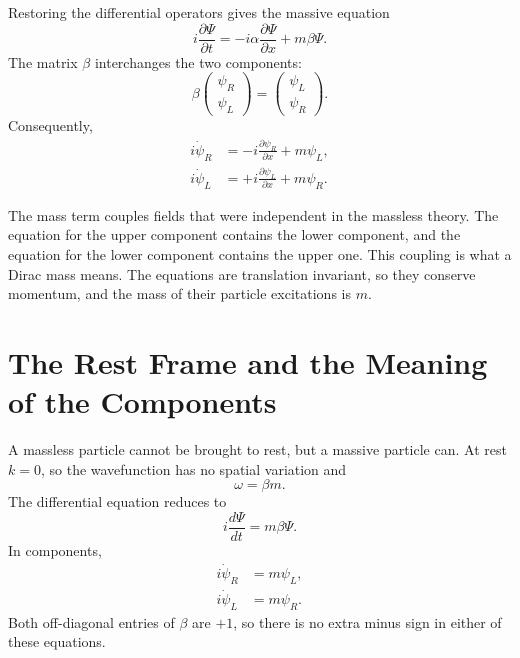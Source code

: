 Restoring the differential operators gives the massive equation
\begin{equation}
i\frac{\partial\Psi}{\partial t}
=
-i\alpha\frac{\partial\Psi}{\partial x}
+m\beta\Psi.
\end{equation}
The matrix \(\beta\) interchanges the two components:
\begin{equation}
\beta
\begin{pmatrix}
\psi_R\\
\psi_L
\end{pmatrix}
=
\begin{pmatrix}
\psi_L\\
\psi_R
\end{pmatrix}.
\end{equation}
Consequently,
\begin{align}
i\dot{\psi}_R
&=-i\frac{\partial\psi_R}{\partial x}+m\psi_L,\\
i\dot{\psi}_L
&=+i\frac{\partial\psi_L}{\partial x}+m\psi_R.
\end{align}

The mass term couples fields that were independent in the massless theory. The equation for the upper component contains the lower component, and the equation for the lower component contains the upper one. This coupling is what a Dirac mass means. The equations are translation invariant, so they conserve momentum, and the mass of their particle excitations is \(m\).

\begin{classroomqa}
\end{classroomqa}

\section{The Rest Frame and the Meaning of the Components}

A massless particle cannot be brought to rest, but a massive particle can. At rest \(k=0\), so the wavefunction has no spatial variation and
\begin{equation}
\omega=\beta m.
\end{equation}
The differential equation reduces to
\begin{equation}
i\frac{d\Psi}{dt}=m\beta\Psi.
\end{equation}
In components,
\begin{align}
i\dot{\psi}_R&=m\psi_L,\\
i\dot{\psi}_L&=m\psi_R.
\end{align}
Both off-diagonal entries of \(\beta\) are \(+1\), so there is no extra minus sign in either of these equations.

